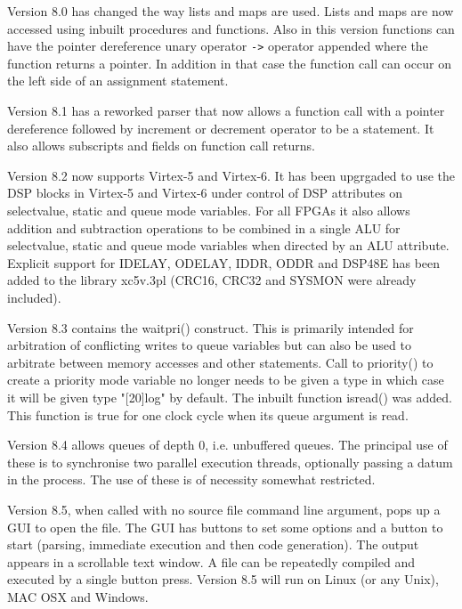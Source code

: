        Version 8.0 has changed the way lists and maps are used. Lists and maps
        are now accessed using inbuilt procedures and functions. Also in this
        version functions can have the pointer dereference unary operator
        \verb'->' operator appended where the function returns a pointer. In
        addition in that case the function call can occur on the left side of an
        assignment statement.

        Version 8.1 has a reworked parser that now allows a function call with a
        pointer dereference followed by increment or decrement operator to be a
        statement. It also allows subscripts and fields on function call
        returns.

        Version 8.2 now supports Virtex-5 and Virtex-6. It has been upgrgaded to
        use the DSP blocks in Virtex-5 and Virtex-6 under control of DSP
        attributes on selectvalue, static and queue mode variables. For all FPGAs
        it also allows addition and subtraction operations to be combined in a
        single ALU for selectvalue, static and queue mode variables when directed
        by an ALU attribute. Explicit support for IDELAY, ODELAY, IDDR, ODDR and
        DSP48E has been added to the library xc5v.3pl (CRC16, CRC32 and SYSMON
        were already included).

        Version 8.3 contains the waitpri() construct. This is primarily intended
        for arbitration of conflicting writes to queue variables but can also be
        used to arbitrate between memory accesses and other statements. Call to
        priority() to create a priority mode variable no longer needs to be
        given a type in which case it will be given type "[20]log" by default.
        The inbuilt function isread() was added. This function is true for one
        clock cycle when its queue argument is read.

        Version 8.4 allows queues of depth 0, i.e. unbuffered queues. The
        principal use of these is to synchronise two parallel execution threads,
        optionally passing a datum in the process. The use of these is of
        necessity somewhat restricted.

        Version 8.5, when called with no source file command line argument,
        pops up a GUI to open the file. The GUI has buttons to set some
        options and a button to start (parsing, immediate execution and
        then code generation). The output appears in a scrollable text window.
        A file can be repeatedly compiled and executed by a single button
        press. Version 8.5 will run on Linux (or any Unix), MAC OSX and
        Windows.

